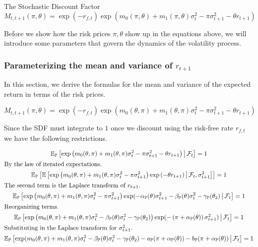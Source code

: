 \documentclass[11pt, letterpaper, twoside, final]{article}
\begin{document}
\begin{defn}{The Stochastic Discount Factor}
    \begin{equation}
        M_{t,t+1}(\pi, \theta) = \exp\left(-r_{f,t}\right) \exp\left(m_{0}(\pi, \theta) + m_1(\pi, \theta)
        \sigma_t^2 - \pi \sigma^2_{t+1} - \theta r_{t+1}\right) 
    \end{equation}
\end{defn}


Before we show how the risk prices $\pi, \theta$ show up in the equations above, we will introduce some parameters
that govern the dynamics of the volatility process.



\subsubsection{\texorpdfstring{Parameterizing the mean and variance of $r_{t+1}$}{Parameterizing the return's
mean and variance}}\label{sec:deriving_sdf_functions}


In this section, we derive the formulas for the mean and variance of the expected return in terms of the risk
prices.

\begin{equation}
    M_{t,t+1}(\pi, \theta) = \exp(-r_{f,t}) \exp \left( m_0(\theta, \pi) + m_1(\theta, \pi) \sigma_t^2 - \pi
    \sigma^2_{t+1} - \theta r_{t+1}\right)
\end{equation}

Since the SDF must integrate to $1$ once we discount using the risk-free rate $r_{f,t}$\, we have the following
restrictions.


\begin{gather}
    \operatorname{\mathbb{E}}_{\mathbb{P}}\left[\exp\left(m_0(\theta, \pi) + m_1(\theta, \pi) \sigma^2_t - \pi \sigma^2_{t+1} - \theta r_{t+1}
    \right) \,\middle\vert\, \mathcal{F}_t \right] = 1 \\
    \intertext{By the law of iterated expectations.}
    \operatorname{\mathbb{E}}_{\mathbb{P}}\left[ \operatorname{\mathbb{E}}\left[\exp\left(m_0(\theta, \pi) + m_1(\theta, \pi) \sigma^2_t - \pi \sigma^2_{t+1}\right)
        \exp\left( - \theta r_{t+1}\right) \,\middle\vert\, \mathcal{F}_t, \sigma^2_{t+1} \right]\right] = 1 \\
    \intertext{The second term is the Laplace transform of $r_{t+1}$.}
    \operatorname{\mathbb{E}}_{\mathbb{P}}\left[\exp\left(m_0(\theta, \pi) + m_1(\theta, \pi) \sigma^2_t - \pi \sigma^2_{t+1} \right)
        \exp(-\alpha_{\mathbb{P}}(\theta) \sigma^2_{t+1} - \beta_{\mathbb{P}}(\theta) \sigma^2_{t} - \gamma_{\mathbb{P}}(\theta_2)
        \,\middle\vert\, \mathcal{F}_t \right] = 1 \\
    \intertext{Reorganizing terms.}
    \operatorname{\mathbb{E}}_{\mathbb{P}}\left[\exp\left(m_0(\theta, \pi) + m_1(\theta, \pi) \sigma^2_t - \beta_{\mathbb{P}}(\theta) \sigma^2_{t} -
        \gamma_{\mathbb{P}}(\theta_2) \right) \exp(-\left(\pi + \alpha_{\mathbb{P}}(\theta)\right) \sigma^2_{t+1}) \,\middle\vert\, \mathcal{F}_t
        \right] = 1 \\ 
    \intertext{Substituting in the Laplace transform for $\sigma^2_{t+1}$.} 
    \operatorname{\mathbb{E}}_{\mathbb{P}}\left[\exp(m_0(\theta, \pi) + m_1(\theta, \pi) \sigma^2_t - \beta_{\mathbb{P}}(\theta) \sigma^2_{t} -
        \gamma_{\mathbb{P}}(\theta_2)  - a_{\mathbb{P}}(\pi + \alpha_{\mathbb{P}}(\theta)) - b_{\mathbb{P}}(\pi + \alpha_{\mathbb{P}}(\theta))
        \,\middle\vert\, \mathcal{F}_t \right] = 1 
\end{gather}
\end{document}
